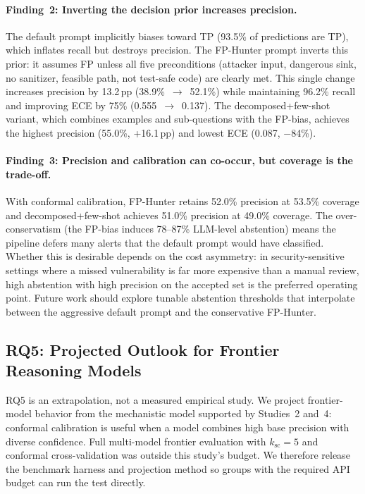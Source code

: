 \paragraph{Finding~2: Inverting the decision prior increases precision.}
The default prompt implicitly biases toward TP (93.5\% of predictions are TP), which inflates recall but destroys precision. The FP-Hunter prompt inverts this prior: it assumes FP unless all five preconditions (attacker input, dangerous sink, no sanitizer, feasible path, not test-safe code) are clearly met. This single change increases precision by 13.2\,pp (38.9\%~$\to$~52.1\%) while maintaining 96.2\% recall and improving ECE by 75\% (0.555~$\to$~0.137). The decomposed+few-shot variant, which combines examples and sub-questions with the FP-bias, achieves the highest precision (55.0\%, +16.1\,pp) and lowest ECE (0.087, $-$84\%).

\paragraph{Finding~3: Precision and calibration can co-occur, but coverage is the trade-off.}
With conformal calibration, FP-Hunter retains 52.0\% precision at 53.5\% coverage and decomposed+few-shot achieves 51.0\% precision at 49.0\% coverage. The over-conservatism (the FP-bias induces 78--87\% LLM-level abstention) means the pipeline defers many alerts that the default prompt would have classified. Whether this is desirable depends on the cost asymmetry: in security-sensitive settings where a missed vulnerability is far more expensive than a manual review, high abstention with high precision on the accepted set is the preferred operating point. Future work should explore tunable abstention thresholds that interpolate between the aggressive default prompt and the conservative FP-Hunter.

\subsection{RQ5: Projected Outlook for Frontier Reasoning Models}
\label{sec:frontier_projections}

RQ5 is an extrapolation, not a measured empirical study. We project frontier-model behavior from the mechanistic model supported by Studies~2 and~4: conformal calibration is useful when a model combines high base precision with diverse confidence. Full multi-model frontier evaluation with $k_{\mathrm{sc}}=5$ and conformal cross-validation was outside this study's budget. We therefore release the benchmark harness and projection method so groups with the required API budget can run the test directly.

